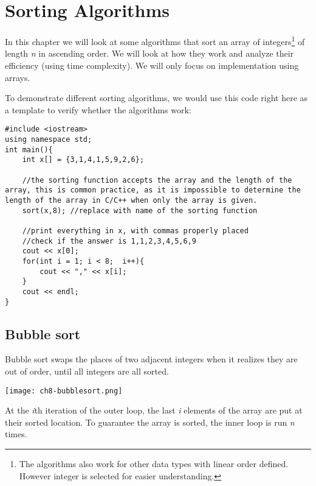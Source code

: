 \chapter{Sorting Algorithms}

In this chapter we will look at some algorithms that sort an array of integers\footnote{The algorithms also work for other data types with linear order defined. However integer is selected for easier understanding.} of length \textit{n} in ascending order. We will look at how they work and analyze their efficiency (using time complexity). We will only focus on implementation using arrays.

To demonstrate different sorting algorithms, we would use this code right here as a template to verify whether the algorithms work:

\begin{lstlisting}
#include <iostream>
using namespace std;
int main(){
    int x[] = {3,1,4,1,5,9,2,6};
    
    //the sorting function accepts the array and the length of the array, this is common practice, as it is impossible to determine the length of the array in C/C++ when only the array is given.
    sort(x,8); //replace with name of the sorting function

    //print everything in x, with commas properly placed
    //check if the answer is 1,1,2,3,4,5,6,9
    cout << x[0];
    for(int i = 1; i < 8;  i++){
        cout << "," << x[i];
    }
    cout << endl;
}
\end{lstlisting}
\pagebreak
\section{Bubble sort}

Bubble sort swaps the places of two adjacent integers when it realizes they are out of order, until all integers are all sorted.

\texttt{[image: ch8-bubblesort.png]}

\pagebreak


\pagebreak

At the \textit{i}th iteration of the outer loop, the last \textit{i} elements of the array are put at their sorted location. To guarantee the array is sorted, the inner loop is run \textit{n} times.
\vspace{6mm}


